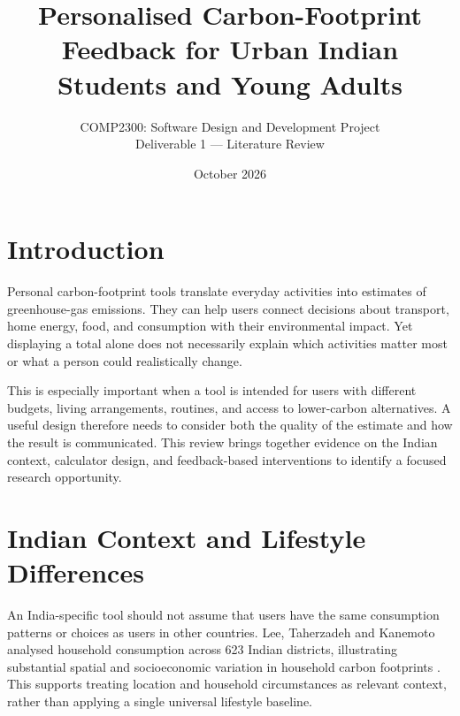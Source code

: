 \documentclass[10pt,a4paper,twocolumn]{article}
\title{\vspace{-1.3em}\Large\bfseries Personalised Carbon-Footprint Feedback for Urban Indian Students and Young Adults}
\author{\normalsize COMP2300: Software Design and Development Project\\[-1pt]
\small Deliverable 1 --- Literature Review}
\date{\small October 2026}
\begin{document}

\section{Introduction}
Personal carbon-footprint tools translate everyday activities into estimates of greenhouse-gas emissions. They can help users connect decisions about transport, home energy, food, and consumption with their environmental impact. Yet displaying a total alone does not necessarily explain which activities matter most or what a person could realistically change.

This is especially important when a tool is intended for users with different budgets, living arrangements, routines, and access to lower-carbon alternatives. A useful design therefore needs to consider both the quality of the estimate and how the result is communicated. This review brings together evidence on the Indian context, calculator design, and feedback-based interventions to identify a focused research opportunity.

\section{Indian Context and Lifestyle Differences}
An India-specific tool should not assume that users have the same consumption patterns or choices as users in other countries. Lee, Taherzadeh and Kanemoto analysed household consumption across 623 Indian districts, illustrating substantial spatial and socioeconomic variation in household carbon footprints \cite{lee2021}. This supports treating location and household circumstances as relevant context, rather than applying a single universal lifestyle baseline.
\end{document}
